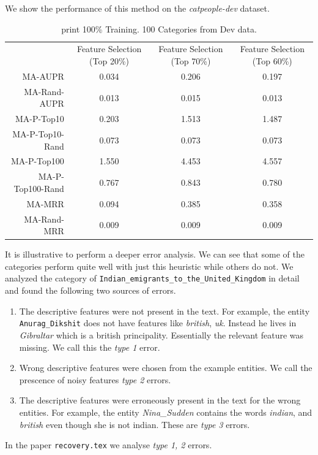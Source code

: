 \documentclass{article}
\begin{document}
We show the performance of this method on the
\textit{catpeople-dev} dataset.
\begin{table}[htbp]
  \centering
{}
  \begin{tabular}{r  c  c c }\toprule
                 & Feature Selection (Top 20\%) & Feature Selection (Top 70\%) & Feature Selection (Top 60\%) \\
MA-AUPR          & 0.034                        & 0.206                        & 0.197                        \\
MA-Rand-AUPR     & 0.013                        & 0.015                        & 0.013                        \\
MA-P-Top10       & 0.203                        & 1.513                        & 1.487                        \\
MA-P-Top10-Rand  & 0.073                        & 0.073                        & 0.073                        \\
MA-P-Top100      & 1.550                        & 4.453                        & 4.557                        \\
MA-P-Top100-Rand & 0.767                        & 0.843                        & 0.780                        \\
MA-MRR           & 0.094                        & 0.385                        & 0.358                        \\
MA-Rand-MRR      & 0.009                        & 0.009                        & 0.009                        \\
\bottomrule\end{tabular}
  \caption{print 100\% Training. 100 Categories from Dev data.}
  \label{tab:summary-nb}
\end{table}

It is illustrative to perform a deeper error analysis.
We can see that some of the categories perform quite well with just this
heuristic while others do not.
We analyzed the category of \verb|Indian_emigrants_to_the_United_Kingdom| in
detail and found the following two sources of errors.
\begin{enumerate}
\item The descriptive features were not present in the text. For example, the
  entity \verb|Anurag_Dikshit| does not have features like \textit{british},
  \textit{uk}. Instead he lives in \textit{Gibraltar} which is a british
  principality. Essentially the relevant feature was missing.
  We call this the \textit{type 1} error.
\item Wrong descriptive features were chosen from the example entities.
  We call the prescence of noisy features \textit{type 2} errors.
\item The descriptive features were erroneously present in the text for the wrong
  entities. For example, the entity \textit{Nina\_Sudden} contains the words
  \textit{indian}, and \textit{british} even though she is not indian. These are
  \textit{type 3} errors.
\end{enumerate}
In the paper \verb|recovery.tex| we analyse \textit{type 1, 2} errors.
\end{document}

